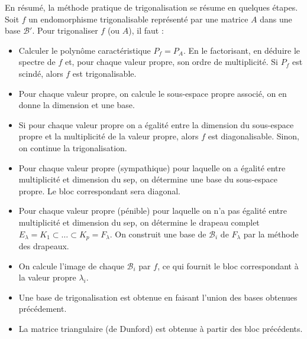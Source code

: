 En résumé, la méthode pratique de trigonalisation se résume en quelques étapes. 
Soit $f$ un endomorphisme trigonalisable représenté par une matrice $A$ dans une base $\mathcal{B}'$. 
Pour trigonaliser $f$ (ou $A$), il faut :
\begin{itemize}
    \item Calculer le polynôme caractéristique $P_f = P_A$. 
    En le factorisant, en déduire le spectre de $f$ et, pour chaque valeur propre, son ordre de multiplicité. 
    Si $P_f$ est scindé, alors $f$ est trigonalisable. 
    \item Pour chaque valeur propre, on calcule le sous-espace propre associé, on en donne la dimension et une base. 
    \item Si pour chaque valeur propre on a égalité entre la dimension du sous-espace propre et la multiplicité de la valeur 
    propre, alors $f$ est diagonalisable. Sinon, on continue la trigonalisation. 
    \item Pour chaque valeur propre (sympathique) pour laquelle on a égalité entre multiplicité et dimension du sep,
    on détermine une base du sous-espace propre. Le bloc correspondant sera diagonal.
    \item Pour chaque valeur propre (pénible) pour laquelle on n’a pas égalité entre multiplicité et dimension du sep,
    on détermine le drapeau complet $E_\lambda = K_1 \subset \dots \subset K_p = F_\lambda$.
    On construit une base de $\mathcal{B}_i$ de $F_\lambda$ par la méthode des drapeaux.
    \item On calcule l'image de chaque $\mathcal{B}_i$ par $f$, ce qui fournit le bloc correspondant à la valeur propre $\lambda_i$. 
    \item Une base de trigonalisation est obtenue en faisant l'union des bases obtenues précédement. 
    \item La matrice triangulaire (de Dunford) est obtenue à partir des bloc précédents. 
\end{itemize}


